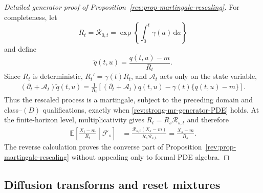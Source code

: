 \documentclass[11pt]{article}
\theoremstyle{remark}
\newcommand{\E}{\mathbb E}
\newcommand{\dd}{\,\mathrm d}
\begin{document}
\begin{proof}[Detailed generator proof of
Proposition~\ref{rev:prop-martingale-rescaling}]
For completeness, let
\[
R_t=\mathcal R_{0,t}=\exp\!\left\{\int_0^t\gamma(a)\dd a\right\}
\]
and define
\[
\widetilde q(t,u)=\frac{q(t,u)-m}{R_t}.
\]
Since $R_t$ is deterministic, $R_t'=\gamma(t)R_t$, and
$\mathcal A_t$ acts only on the state variable,
\begin{align}
(\partial_t+\mathcal A_t)\widetilde q(t,u)
=\frac{1}{R_t}
\left[(\partial_t+\mathcal A_t)q(t,u)
-\gamma(t)\{q(t,u)-m\}\right].
\label{rev:app-rescaled-generator}
\end{align}
Thus the rescaled process is a martingale, subject to the preceding domain and
class--$(D)$ qualifications, exactly when
\eqref{rev:strong-mr-generator-PDE} holds.  At the finite-horizon level,
multiplicativity gives $R_t=R_s\mathcal R_{s,t}$ and therefore
\begin{align*}
\E\!\left[\frac{X_t-m}{R_t}\middle|\mathcal F_s\right]
&=\frac{\mathcal R_{s,t}(X_s-m)}{R_s\mathcal R_{s,t}}
=\frac{X_s-m}{R_s}.
\end{align*}
The reverse calculation proves the converse part of
Proposition~\ref{rev:prop-martingale-rescaling} without appealing only to formal PDE
algebra.
\end{proof}

\subsection{Diffusion transforms and reset mixtures}
\label{rev:app-transform-reset-proofs}
\end{document}
